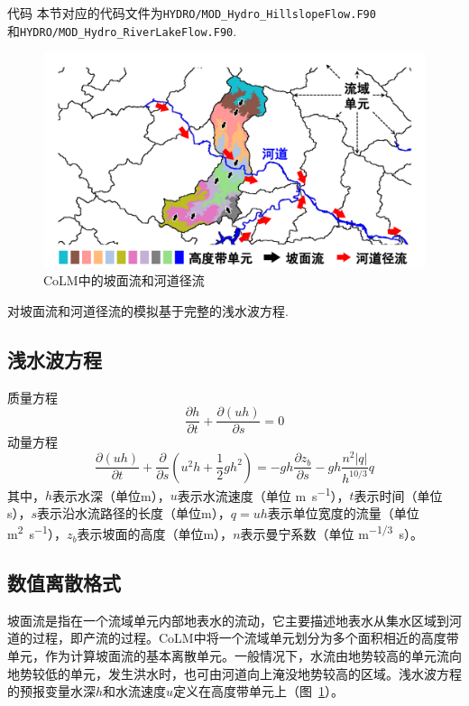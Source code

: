 \begin{mymdframed}{代码}
本节对应的代码文件为\texttt{HYDRO/MOD\_Hydro\_HillslopeFlow.F90} \\
和\texttt{HYDRO/MOD\_Hydro\_RiverLakeFlow.F90}.
\end{mymdframed}

{
\begin{figure}[htbp]
\centering
\includegraphics[width=\textwidth]{Figures/侧向流/坡面流和河道径流.pdf}
\caption{CoLM中的坡面流和河道径流}
\label{fig:坡面流和河道径流}
\end{figure}
}

对坡面流和河道径流的模拟基于完整的浅水波方程.
 \subsection{浅水波方程}
 质量方程
  \begin{equation}
 \frac{\partial h}{\partial t} + \frac{\partial \left(uh\right)}{\partial s} = 0
 \end{equation}
 动量方程
 \begin{equation}
 \frac{\partial \left(uh\right)}{\partial t} + \frac{\partial}{\partial s}\left(u^2h+\frac{1}{2}gh^2\right) = -gh\frac{\partial z_b}{\partial s}-gh\frac{n^2\left|q\right|}{h^{10/3}}q
  \end{equation}
  其中，$h$表示水深（单位m），$u$表示水流速度（单位 \unit{m.s^{-1}}），$t$表示时间（单位s），$s$表示沿水流路径的长度（单位m），$q=uh$表示单位宽度的流量（单位 \unit{m^2.s^{-1}}），$z_b$表示坡面的高度（单位m），$n$表示曼宁系数（单位 \unit{m^{-1/3}.s}）。


\subsection{数值离散格式}
坡面流是指在一个流域单元内部地表水的流动，它主要描述地表水从集水区域到河道的过程，即产流的过程。CoLM中将一个流域单元划分为多个面积相近的高度带单元，作为计算坡面流的基本离散单元。一般情况下，水流由地势较高的单元流向地势较低的单元，发生洪水时，也可由河道向上淹没地势较高的区域。浅水波方程的预报变量水深$h$和水流速度$u$定义在高度带单元上（图~\ref{fig:坡面流和河道径流}）。

